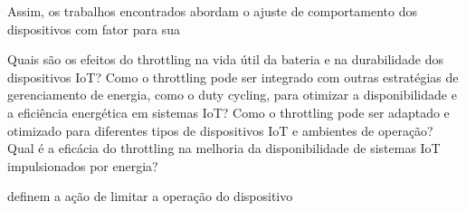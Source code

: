  Assim, os trabalhos encontrados abordam o ajuste de comportamento dos dispositivos com fator para sua 



Quais são os efeitos do throttling na vida útil da bateria e na durabilidade dos dispositivos IoT?
Como o throttling pode ser integrado com outras estratégias de gerenciamento de energia, como o duty cycling, para otimizar a disponibilidade e a eficiência energética em sistemas IoT?
Como o throttling pode ser adaptado e otimizado para diferentes tipos de dispositivos IoT e ambientes de operação?
Qual é a eficácia do throttling na melhoria da disponibilidade de sistemas IoT impulsionados por energia?


definem a ação de limitar a operação do dispositivo

